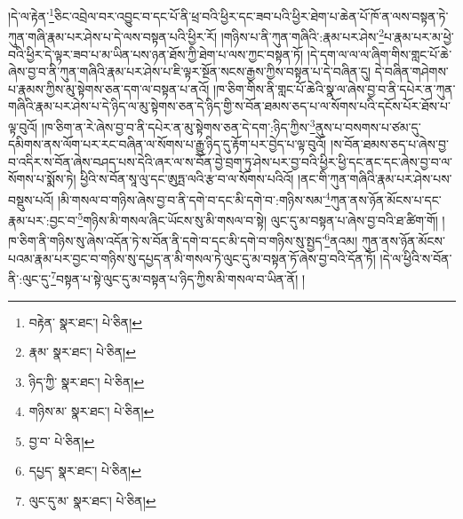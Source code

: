 །དེ་ལ་རྟེན་\footnote{བརྟེན་  སྣར་ཐང་།  པེ་ཅིན། }ཅིང་འབྲེལ་བར་འབྱུང་བ་དང་པོ་ནི་ཕྲ་བའི་ཕྱིར་དང་ཟབ་པའི་ཕྱིར་ཐེག་པ་ཆེན་པོ་ཁོ་ན་ལས་བསྟན་ཏེ་ཀུན་གཞི་རྣམ་པར་ཤེས་པ་དེ་ལས་བསྟན་པའི་ཕྱིར་རོ། །གཉིས་པ་ནི་ཀུན་གཞིའི་:རྣམ་པར་ཤེས་\footnote{རྣམ་  སྣར་ཐང་།  པེ་ཅིན། }པ་རྣམ་པར་མ་ཕྱེ་བའི་ཕྱིར་དེ་ལྟར་ཟབ་པ་མ་ཡིན་པས་ཉན་ཐོས་ཀྱི་ཐེག་པ་ལས་ཀྱང་བསྟན་ཏོ། །དེ་དག་ལ་ལ་ལ་ཞིག་གིས་གླང་པོ་ཆེ་ཞེས་བྱ་བ་ནི་ཀུན་གཞིའི་རྣམ་པར་ཤེས་པ་ཇི་ལྟར་སྔོན་སངས་རྒྱས་ཀྱིས་བསྟན་པ་དེ་བཞིན་དུ། དེ་བཞིན་གཤེགས་པ་རྣམས་ཀྱིས་མུ་སྟེགས་ཅན་དག་ལ་བསྟན་པ་ནའོ། །ཁ་ཅིག་གིས་ནི་གླང་པོ་ཆེའི་སྣ་ལ་ཞེས་བྱ་བ་ནི་དཔེར་ན་ཀུན་གཞིའི་རྣམ་པར་ཤེས་པ་དེ་ཉིད་ལ་མུ་སྟེགས་ཅན་དེ་ཉིད་གྱི་ས་བོན་ཐམས་ཅད་པ་ལ་སོགས་པའི་དངོས་པོར་ཐོས་པ་ལྟ་བུའོ། །ཁ་ཅིག་ན་རེ་ཞེས་བྱ་བ་ནི་དཔེར་ན་མུ་སྟེགས་ཅན་དེ་དག་:ཉིད་ཀྱིས་\footnote{ཉིད་ཀྱི་  སྣར་ཐང་།  པེ་ཅིན། }ནུས་པ་བསགས་པ་ཙམ་དུ་དམིགས་ནས་ལོག་པར་རང་བཞིན་ལ་སོགས་པ་རྒྱུ་ཉིད་དུ་རྟོག་པར་བྱེད་པ་ལྟ་བུའོ། །ས་བོན་ཐམས་ཅད་པ་ཞེས་བྱ་བ་འདིར་ས་བོན་ཞེས་བཤད་པས་དེའི་ཞར་ལ་ས་བོན་བྱེ་བྲག་ཏུ་ཤེས་པར་བྱ་བའི་ཕྱིར་ཕྱི་དང་ནང་དང་ཞེས་བྱ་བ་ལ་སོགས་པ་སྨོས་ཏེ། ཕྱིའི་ས་བོན་སཱ་ལུ་དང་ཨུཏྤ་ལའི་རྩ་བ་ལ་སོགས་པའིའོ། །ནང་གི་ཀུན་གཞིའི་རྣམ་པར་ཤེས་པས་བསྡུས་པའོ། །མི་གསལ་བ་གཉིས་ཞེས་བྱ་བ་ནི་དགེ་བ་དང་མི་དགེ་བ་:གཉིས་སམ་\footnote{གཉིས་མ་  སྣར་ཐང་།  པེ་ཅིན། }ཀུན་ནས་ཉོན་མོངས་པ་དང་རྣམ་པར་:བྱང་བ་\footnote{བྱ་བ་  པེ་ཅིན། }གཉིས་མི་གསལ་ཞིང་ཡོངས་སུ་མི་གསལ་བ་སྟེ། ལུང་དུ་མ་བསྟན་པ་ཞེས་བྱ་བའི་ཐ་ཚིག་གོ། །ཁ་ཅིག་ནི་གཉིས་སུ་ཞེས་འདོན་ཏེ་ས་བོན་ནི་དགེ་བ་དང་མི་དགེ་བ་གཉིས་སུ་སྤྱད་\footnote{དཔྱད་  སྣར་ཐང་།  པེ་ཅིན། }ནའམ། ཀུན་ནས་ཉོན་མོངས་པའམ་རྣམ་པར་བྱང་བ་གཉིས་སུ་དཔྱད་ན་མི་གསལ་ཏེ་ལུང་དུ་མ་བསྟན་ཏོ་ཞེས་བྱ་བའི་དོན་ཏོ། །དེ་ལ་ཕྱིའི་ས་བོན་ནི་:ལུང་དུ་\footnote{ལུང་དུ་མ་  སྣར་ཐང་།  པེ་ཅིན། }བསྟན་པ་སྟེ་ལུང་དུ་མ་བསྟན་པ་ཉིད་ཀྱིས་མི་གསལ་བ་ཡིན་ནོ། །
